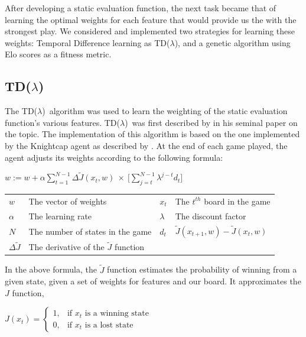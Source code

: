 \documentclass[11pt]{article}
\newcommand{\tdl}{TD($\lambda$)}
\begin{document}
After developing a static evaluation function, the next task became that of
learning the optimal weights for each feature that would provide us the with
the strongest play. We considered and implemented two strategies for learning
these weights: Temporal Difference learning as \tdl, and a genetic algorithm
using Elo scores as a fitness metric.

\subsection{\tdl}
\label{sub:tdlambda}

The \tdl\ algorithm was used to learn the weighting of the static evaluation
function's various features. \tdl\ was first described by \citet{Sutton1988}
in his seminal paper on the topic. The implementation of this algorithm is
based on the one implemented by the Knightcap agent as described by
\citet{Baxter1997}.  At the end of each game played, the agent adjusts its
weights according to the following formula:

\begin{center}

    $\displaystyle w := w + \alpha \sum _{t=1} ^{N-1} \Delta \tilde{J}(x_t,w) \: \times \: \Big[ \sum ^ {N-1} _{j=t} \lambda^{j-t} d_t \Big] $\\
        
    \begin{tabular}{  l l | l l }
      $w$                   & The vector of weights                         &$x_t$  & The $t^{th}$ board in the game \\
      $\alpha$              & The learning rate                             &$\lambda$      &The discount factor \\
      $N$                   & The number of states in the game              &$d_t$          &$\tilde{J}(x_{t+1},w) - \tilde{J}(x_t,w)$\\
      $\Delta \tilde{J}$    & The derivative of the $\tilde{J}$ function    &               &\\
    \end{tabular}
\end{center}

In the above formula, the $\tilde{J}$ function estimates the probability of
winning from a given state, given a set of weights for features and our board.
It approximates the $J$ function, \\

\begin{center}
$
J(x_t) = \begin{cases} 1, & \mbox{if } x_t\mbox{ is a winning state} \\ 0, & \mbox{if } x_t\mbox{ is a lost state} \end{cases}
$
\end{center}
\end{document}
